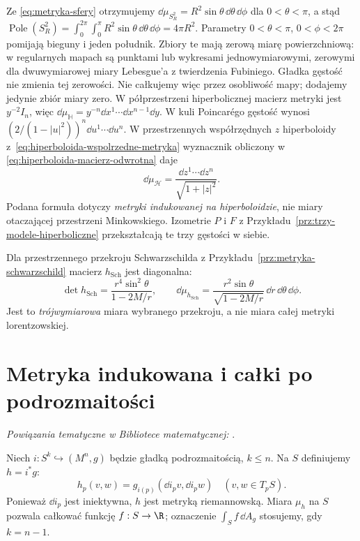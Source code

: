 \begin{przyklad}
Ze \eqref{eq:metryka-sfery} otrzymujemy
$\dd\mu_{S_R^2}=R^2\sin\theta\,
\dd\theta\,\dd\phi$ dla $0<\theta<\pi$,
a stąd
$\operatorname{Pole}(S_R^2)
=\int_0^{2\pi}\int_0^\pi
R^2\sin\theta\,\dd\theta\,\dd\phi=4\pi R^2$.
Parametry $0<\theta<\pi$, $0<\phi<2\pi$ pomijają
bieguny i jeden południk. Zbiory te mają zerową miarę
powierzchniową: w regularnych mapach są punktami lub
wykresami jednowymiarowymi, zerowymi dla dwuwymiarowej
miary Lebesgue'a z twierdzenia Fubiniego. Gładka gęstość
nie zmienia tej zerowości. Nie całkujemy więc przez
osobliwość mapy; dodajemy jedynie zbiór miary zero.
W półprzestrzeni hiperbolicznej macierz
metryki jest $y^{-2}I_n$, więc
$\dd\mu_{\mathbb H}=y^{-n}\dd x^1\cdots
\dd x^{n-1}\dd y$.
W kuli Poincarégo gęstość wynosi
$(2/(1-|u|^2))^n\dd u^1\cdots\dd u^n$.
W przestrzennych współrzędnych $z$ hiperboloidy
z~\eqref{eq:hiperboloida-wspolrzedne-metryka}
wyznacznik obliczony w
\eqref{eq:hiperboloida-macierz-odwrotna} daje
\[
 \dd\mu_{\mathcal H}
  =\frac{\dd z^1\cdots\dd z^n}{\sqrt{1+|z|^2}}.
\]
Podana formuła dotyczy \emph{metryki indukowanej
na hiperboloidzie}, nie miary otaczającej
przestrzeni Minkowskiego. Izometrie $P$ i $F$
z Przykładu~\ref{prz:trzy-modele-hiperboliczne}
przekształcają te trzy gęstości w siebie.

Dla przestrzennego przekroju Schwarzschilda
z Przykładu~\ref{prz:metryka-schwarzschild}
macierz $h_{\mathrm{Sch}}$ jest diagonalna:
\[
 \det h_{\mathrm{Sch}}
  =\frac{r^4\sin^2\theta}{1-2M/r},
 \qquad
 \dd\mu_{h_{\mathrm{Sch}}}
  =\frac{r^2\sin\theta}{\sqrt{1-2M/r}}\,
       \dd r\,\dd\theta\,\dd\phi.
\]
Jest to \emph{trójwymiarowa} miara wybranego
przekroju, a nie miara całej metryki lorentzowskiej.
\end{przyklad}

\section{Metryka indukowana i całki po podrozmaitości}
\label{sec:metryka-indukowana}

\noindent\emph{Powiązania tematyczne w Bibliotece matematycznej:} .


\begin{definicja}
\label{def:metryka-indukowana}
Niech $i:S^k\hookrightarrow(M^n,g)$ będzie
gładką podrozmaitością, $k\leq n$.
Na $S$ definiujemy $h=i^*g$:
\[
 h_p(v,w)=g_{i(p)}(\dd i_pv,\dd i_pw)
 \quad(v,w\in T_pS).
\]
Ponieważ $\dd i_p$ jest iniektywna, $h$ jest
metryką riemannowską. Miara $\mu_h$ na $S$
pozwala całkować funkcję $f:S\to\R$;
oznaczenie $\int_S f\,\dd A_g$ stosujemy,
gdy $k=n-1$.
\end{definicja}

